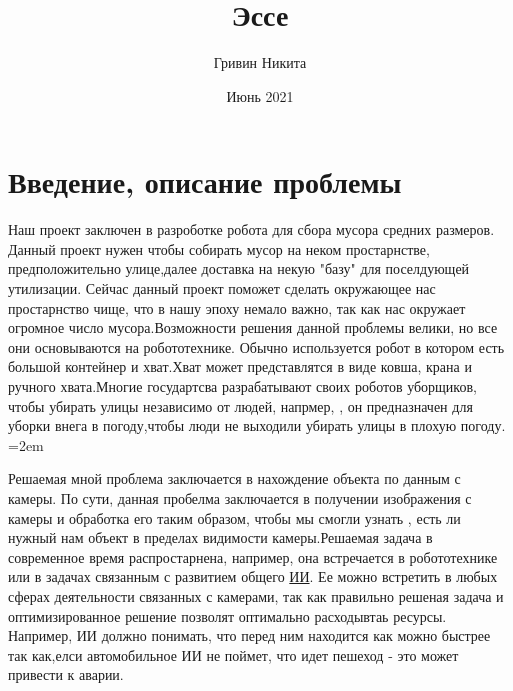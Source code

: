 \documentclass{article}
\title{Эссе}
\author{Гривин Никита}
\date{Июнь 2021}
\begin{document}
\maketitle
\section{Введение, описание проблемы}
    \qquad Наш проект заключен в разроботке робота для сбора мусора средних размеров. Данный проект нужен чтобы собирать мусор на неком простарнстве, предположительно улице,далее доставка на некую "базу" для поселдующей утилизации. Сейчас данный проект поможет сделать окружающее нас простарнство чище, что в нашу эпоху немало важно, так как нас окружает огромное число мусора.Возможности решения данной проблемы велики, но все они основываются на робототехнике. Обычно используется робот в котором есть большой контейнер и хват.Хват может представлятся в виде ковша, крана и ручного хвата.Многие государтсва разрабатывают своих роботов уборщиков, чтобы убирать улицы независимо от людей, напрмер, , он предназначен для уборки внега в погоду,чтобы люди не выходили убирать улицы в плохую погоду. \parindent=2em
    
   \par Решаемая мной проблема заключается в нахождение объекта по данным с камеры. По сути, данная пробелма заключается в получении изображения с камеры и обработка его таким образом, чтобы мы смогли узнать , есть ли нужный нам объект в пределах видимости  камеры.Решаемая задача в современное время распростарнена, например, она встречается в робототехнике или в задачах связанным с развитием общего \textcolor{blue}{\href{https://en.wikipedia.org/wiki/Artificial_intelligence}{ИИ}}. Ее можно встретить в любых сферах деятельности связанных с камерами, так как правильно решеная задача и оптимизированное решение позволят оптимально расходывтаь ресурсы. Например, ИИ должно понимать, что перед ним находится как можно быстрее так как,елси автомобильное ИИ не поймет, что идет пешеход - это может привести к аварии.
\end{document}
